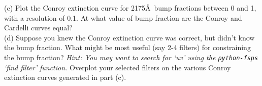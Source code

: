 \documentclass{article}
\begin{document}
(c)  Plot the Conroy extinction curve for 2175\AA\ bump fractions between 0 and 1, with a resolution of 0.1.  At what value of bump fraction are the Conroy and Cardelli curves equal?  \\

(d) Suppose you knew the Conroy extinction curve was correct, but didn't know the bump fraction.  What might be most useful (say 2-4 filters) for constraining the bump fraction?  \textit{Hint: You may want to search for `uv' using the \texttt{python-fsps} `find filter' function.}  Overplot your selected filters on the various Conroy extinction curves generated in part (c).
\end{document}
